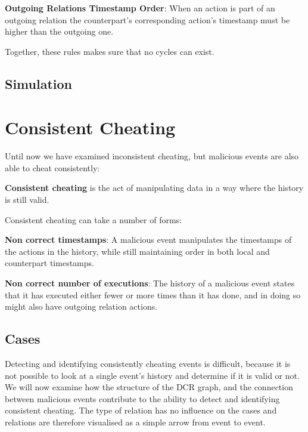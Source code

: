 	\newpar \textbf{Outgoing Relations Timestamp Order}: When an action is part of an outgoing relation the counterpart's corresponding action's timestamp must be higher than the outgoing one.
	
	\newpar Together, these rules makes sure that no cycles can exist.
    
	\subsection{Simulation}
	
	
	\section{Consistent Cheating}
	Until now we have examined inconsistent cheating, but malicious events are also able to cheat consistently:
	\begin{definition}
		\textbf{Consistent cheating} is the act of manipulating data in a way where the history is still valid.
	\end{definition}
	
	\newpar Consistent cheating can take a number of forms:

	\newpar \textbf{Non correct timestamps}: A malicious event manipulates the timestamps of the actions in the history, while still maintaining order in both local and counterpart timestamps.
	
	\newpar \textbf{Non correct number of executions}: The history of a malicious event states that it has executed either fewer or more times than it has done, and in doing so might also have outgoing relation actions.
	
	\subsection{Cases}
	Detecting and identifying consistently cheating events is difficult, because it is not possible to look at a single event's history and determine if it is valid or not. We will now examine how the structure of the DCR graph, and the connection between malicious events contribute to the ability to detect and identifying consistent cheating. The type of relation has no influence on the cases and relations are therefore visualised as a simple arrow from event to event.
	
